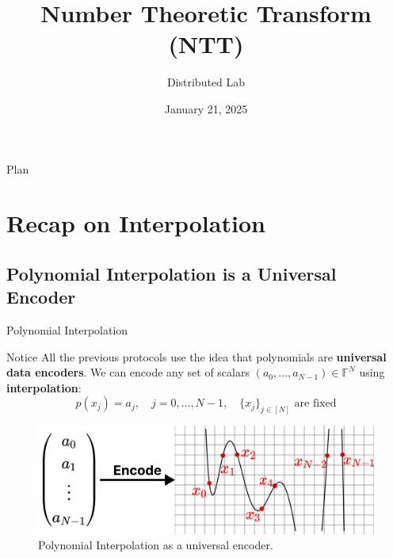 \documentclass{zkdl-presentation-template}
\title[NNT. PlonK]{\textbf{Number Theoretic Transform (NTT)}}
\author{Distributed Lab}
\date{January 21, 2025}
\begin{document}

    \begin{frame}{Plan}
        \tableofcontents
    \end{frame}

    \section{Recap on Interpolation}

    \subsection{Polynomial Interpolation is a Universal Encoder}
    \begin{frame}{Polynomial Interpolation}
        \begin{block}{Notice}
            All the previous protocols use the idea that polynomials 
            are \textbf{universal data encoders}. We can encode any 
            set of scalars $(a_0,\dots,a_{N-1}) \in \mathbb{F}^N$ 
            using \textbf{interpolation}:
            \begin{equation*}
                p(x_j) = a_j, \quad j = 0,\dots,N-1, \quad \text{$\{x_j\}_{j \in [N]}$ are fixed}
            \end{equation*}
        \end{block}

        \begin{figure}
            \centering
            \includegraphics[width=\textwidth]{images/lecture_13/encoding.pdf}
            \caption{Polynomial Interpolation as a universal encoder.}
        \end{figure}        
    \end{frame}
\end{document}
